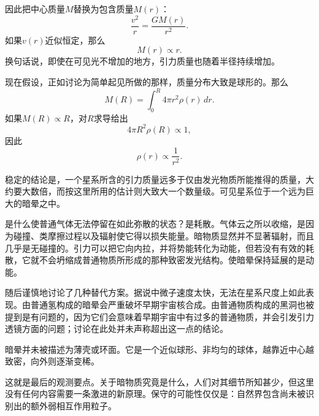 因此把中心质量\(M\)替换为包含质量\(M(r)\)：
\begin{equation}
\frac{v^2}{r}=\frac{G M(r)}{r^2}.
\end{equation}
如果\(v(r)\)近似恒定，那么
\begin{equation}
M(r)\propto r.
\end{equation}
换句话说，即使在可见光不增加的地方，引力质量也随着半径持续增加。

现在假设，正如讨论为简单起见所做的那样，质量分布大致是球形的。那么
\begin{equation}
M(R)=\int_0^R 4\pi r^2\rho(r)\,dr.
\end{equation}
如果\(M(R)\propto R\)，对\(R\)求导给出
\begin{equation}
4\pi R^2\rho(R)\propto 1,
\end{equation}
因此
\begin{equation}
\rho(r)\propto \frac{1}{r^2}.
\end{equation}

\begin{classroomqa}
\end{classroomqa}

稳定的结论是，一个星系所含的引力质量远多于仅由发光物质所能推得的质量，大约要大数倍，而按这里所用的估计则大致大一个数量级。可见星系位于一个远为巨大的暗晕之中。

是什么使普通气体无法停留在如此弥散的状态？是耗散。气体云之所以收缩，是因为碰撞、类摩擦过程以及辐射使它得以损失能量。暗物质显然并不显著辐射，而且几乎是无碰撞的。引力可以把它向内拉，并将势能转化为动能，但若没有有效的耗散，它就不会坍缩成普通物质所形成的那种致密发光结构。使暗晕保持延展的是动能。

随后谨慎地讨论了几种替代方案。据说中微子速度太快，无法在星系尺度上如此表现。由普通氢构成的暗晕会严重破坏早期宇宙核合成。由普通物质构成的黑洞也被提到是有问题的，因为它们会意味着早期宇宙中有过多的普通物质，并会引发引力透镜方面的问题；讨论在此处并未声称超出这一点的结论。

暗晕并未被描述为薄壳或环面。它是一个近似球形、非均匀的球体，越靠近中心越致密，向外则逐渐变稀。

\begin{classroomqa}
\end{classroomqa}

这就是最后的观测要点。关于暗物质究竟是什么，人们对其细节所知甚少，但这里没有任何内容需要一条激进的新原理。保守的可能性仅仅是：自然界包含尚未被识别出的额外弱相互作用粒子。
